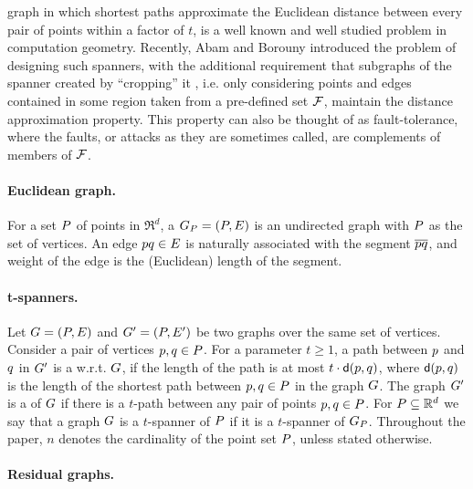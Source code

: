 \documentclass[12pt]{article}%
\begin{document}
graph in which shortest paths approximate the
Euclidean distance between every pair of points within a factor of
$t$, is a well known and well studied problem in computation
geometry. Recently, Abam and Borouny \cite{ab-lgs-21} introduced the
problem of designing such spanners, with the additional requirement
that subgraphs of the spanner created by ``cropping'' it , i.e. only
considering points and edges contained in some region taken from a
pre-defined set $\mathcal{F}$, maintain the distance approximation
property. This property can also be thought of as fault-tolerance,
where the faults, or attacks as they are sometimes called, are
complements of members of $\mathcal{F}$.


\paragraph{Euclidean graph.}
For a set $P$ of points in $\Re^d$, a 
$G_P = (P, E)$ is an undirected graph with $P$ as the set of
vertices. An edge $p q \in E$ is naturally associated with the
segment $\overline{pq}$, and weight of the edge is the (Euclidean)
length of the segment.


\paragraph{t-spanners.}
Let $G=(P,E)$ and $G'=(P,E')$ be two graphs over the same
set of vertices. Consider a pair of vertices $p,q \in P$. For a
parameter $t \geq 1$, a path between $p$ and $q$ in $G'$ is a
 w.r.t. $G$, if the length of the path is at most
$t \cdot \dGY{\pa}{\pb}$, where $\dGY{\pa}{\pb}$ is the length of the
shortest path between $p,q\in P$ in the graph $G$.  The graph
$G'$ is a  of $G$ if there is a $t$-path between
any pair of points $p,q\in P$.  For $P\subseteq \mathbb{R}^d$ we say
that a graph $G$ is a $t$-spanner of $P$ if it is a $t$-spanner of
$G_P$. Throughout the paper, $n$ denotes the cardinality of the
point set $P$, unless stated otherwise.


\paragraph{Residual graphs.}
\end{document}
